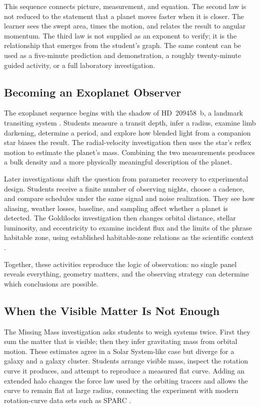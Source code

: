 \documentclass[twocolumn]{aastex631}
\begin{document}
This sequence connects picture, measurement, and equation. The second law is not
reduced to the statement that a planet moves faster when it is closer. The
learner sees the swept area, times the motion, and relates the result to angular
momentum. The third law is not supplied as an exponent to verify; it is the
relationship that emerges from the student's graph. The same content can be
used as a five-minute prediction and demonstration, a roughly twenty-minute
guided activity, or a full laboratory investigation.

\subsection{Becoming an Exoplanet Observer}

The exoplanet sequence begins with the shadow of HD~209458~b, a landmark
transiting system \citep{charbonneau2000}. Students measure a transit depth,
infer a radius, examine limb darkening, determine a period, and explore how
blended light from a companion star biases the result. The radial-velocity
investigation then uses the star's reflex motion to estimate the planet's mass.
Combining the two measurements produces a bulk density and a more physically
meaningful description of the planet.

Later investigations shift the question from parameter recovery to experimental
design. Students receive a finite number of observing nights, choose a cadence,
and compare schedules under the same signal and noise realization. They see how
aliasing, weather losses, baseline, and sampling affect whether a planet is
detected. The Goldilocks investigation then changes orbital distance, stellar
luminosity, and eccentricity to examine incident flux and the limits of the
phrase habitable zone, using established habitable-zone relations as the
scientific context \citep{kopparapu2013}.

Together, these activities reproduce the logic of observation: no single panel
reveals everything, geometry matters, and the observing strategy can determine
which conclusions are possible.

\subsection{When the Visible Matter Is Not Enough}

The Missing Mass investigation asks students to weigh systems twice. First they
sum the matter that is visible; then they infer gravitating mass from orbital
motion. These estimates agree in a Solar System-like case but diverge for a
galaxy and a galaxy cluster. Students arrange visible mass, inspect the rotation
curve it produces, and attempt to reproduce a measured flat curve. Adding an
extended halo changes the force law used by the orbiting tracers and allows the
curve to remain flat at large radius, connecting the experiment with modern
rotation-curve data sets such as SPARC \citep{lelli2016}.
\end{document}
